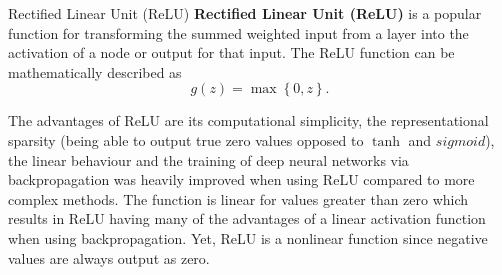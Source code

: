     \begin{pabox}{Rectified Linear Unit (ReLU)}
    \label{def:relu-definition}
      \textbf{Rectified Linear Unit (ReLU)} is a popular function for transforming the summed weighted input from a layer into the activation of a node or output for that input.
      The ReLU function can be mathematically described as $$g(z) = \max \left\{0, z\right\}.$$

    \end{pabox}
    The advantages of ReLU are its computational simplicity, the representational sparsity (being able to output true zero values opposed to $\tanh$ and $sigmoid$), the linear behaviour and the training of deep neural networks via backpropagation was heavily improved when using ReLU compared to more complex methods. The function is linear for values greater than zero which results in ReLU having many of the advantages of a linear activation function when using backpropagation. Yet, ReLU is a nonlinear function since negative values are always output as zero.

